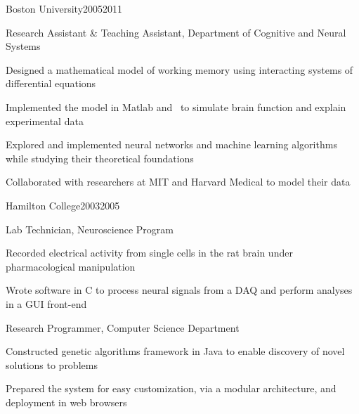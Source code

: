 \documentclass{report}
\begin{document}

  \begin{work_location}{Boston University}{2005}{2011}

    \begin{position}{Research Assistant \& Teaching Assistant, Department of Cognitive and Neural Systems}
      \item Designed a mathematical model of working memory using interacting systems of differential equations
      \item Implemented the model in Matlab and \CC~to simulate brain function and explain experimental data
      \item Explored and implemented neural networks and machine learning algorithms while studying their theoretical foundations
      \item Collaborated with researchers at MIT and Harvard Medical to model their data
    \end{position}

  \end{work_location}



  \begin{work_location}{Hamilton College}{2003}{2005}

    \begin{position}{Lab Technician, Neuroscience Program}
      \item Recorded electrical activity from single cells in the rat brain under pharmacological manipulation
      \item Wrote software in C to process neural signals from a DAQ and perform analyses in a GUI front-end
    \end{position}

    \vspace{.5mm}

    \begin{position}{Research Programmer, Computer Science Department}
      \item Constructed genetic algorithms framework in Java to enable discovery of novel solutions to problems
      \item Prepared the system for easy customization, via a modular architecture, and deployment in web browsers
    \end{position}

  \end{work_location}






  \vspace{2mm}

\end{document}
